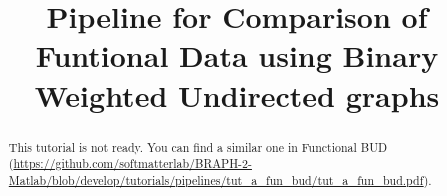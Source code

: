 \documentclass[justified]{tufte-handout}
\title{Pipeline for Comparison of Funtional Data using Binary Weighted Undirected graphs}
\begin{document}
\maketitle

\begin{abstract}
\noindent
This tutorial is not ready. You can find a similar one in Functional BUD (\url{https://github.com/softmatterlab/BRAPH-2-Matlab/blob/develop/tutorials/pipelines/tut_a_fun_bud/tut_a_fun_bud.pdf}).
\end{abstract}
\end{document}

